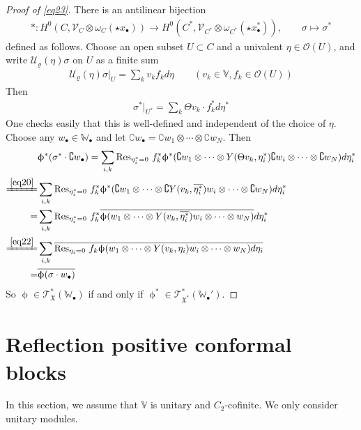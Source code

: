 \documentclass[11pt,b5paper,notitlepage]{article}
\theoremstyle{definition}
\theoremstyle{plain}
\newcommand{\fk}{\mathfrak}
\newcommand{\mc}{\mathcal}
\newcommand{\ovl}{\overline}
\newcommand{\Res}{\mathrm{Res}}
\newcommand{\scr}{\mathscr}
\newcommand{\Co}{\complement}
\newcommand{\blt}{\bullet}
\newcommand{\Vbb}{\mathbb V}
\newcommand{\Wbb}{\mathbb W}
\numberwithin{equation}{section}
\begin{document}
\begin{proof}[Proof of \eqref{eq23}]
There is an antilinear bijection 
\begin{gather*}
*:H^0(C,\scr V_C\otimes\omega_C(\star x_\blt))\rightarrow H^0(C^*,\scr V_{C^*}\otimes\omega_{C^*}(\star x_\blt^*)),\qquad \sigma\mapsto \sigma^*
\end{gather*}
defined as follows. Choose an open subset $U\subset C$ and a univalent $\eta\in\scr O(U)$, and write $\mc U_\varrho(\eta)\sigma$ on $U$ as a finite sum
\begin{align*}
\mc U_\varrho(\eta)\sigma|_U=\sum_k v_kf_kd\eta \qquad(v_k\in\Vbb,f_k\in\scr O(U))
\end{align*}
Then
\begin{align*}
\sigma^*|_{U^*}=\sum_k\Theta v_k\cdot f_k^*d\eta^*
\end{align*}
One checks easily that this is well-defined and independent of the choice of $\eta$. Choose any $w_\blt\in\Wbb_\blt$ and let $\Co w_\blt=\Co w_1\otimes\cdots\otimes\Co w_N$. Then
\begin{align*}
&\upphi^*(\sigma^*\cdot \Co w_\blt)=\sum_{i,k}\Res_{\eta_i^*=0}~f_k^*\upphi^*(\Co w_1\otimes\cdots\otimes Y(\Theta v_k,\eta_i^*)\Co w_i\otimes\cdots\otimes \Co w_N)d\eta_i^* \\
\xlongequal{\eqref{eq20}}&\sum_{i,k}\Res_{\eta_i^*=0}~f_k^*\upphi^*(\Co w_1\otimes\cdots \otimes \Co Y(v_k,\ovl{\eta_i^*}) w_i\otimes\cdots\otimes \Co w_N)d\eta_i^*\\
=&\sum_{i,k}\Res_{\eta_i^*=0}~f_k^*\ovl{\upphi(w_1\otimes\cdots \otimes Y(v_k,\ovl{\eta_i^*}) w_i\otimes\cdots\otimes w_N)}d\eta_i^*\\
\xlongequal{\eqref{eq22}}&\sum_{i,k}\ovl{\Res_{\eta_i=0}~f_k\upphi(w_1\otimes\cdots \otimes Y(v_k,\eta_i) w_i\otimes\cdots\otimes w_N)d \eta_i}\\
=&\ovl{\upphi(\sigma\cdot w_\blt)}
\end{align*}
So $\upphi\in\scr T_{\fk X}^*(\Wbb_\blt)$ if and only if $\upphi^*\in\scr T_{\fk X^*}^*(\Wbb_\blt')$.
\end{proof}






\section{Reflection positive conformal blocks}


In this section, we assume that $\Vbb$ is unitary and $C_2$-cofinite. We only consider unitary modules.
\end{document}

